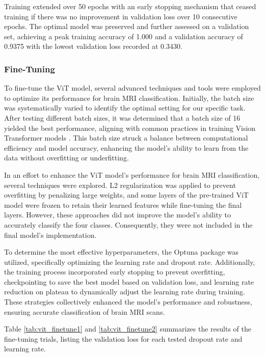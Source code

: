 Training extended over 50 epochs with an early stopping mechanism that ceased training if there was no improvement in validation loss over 10 consecutive epochs. The optimal model was preserved and further assessed on a validation set, achieving a peak training accuracy of 1.000 and a validation accuracy of 0.9375 with the lowest validation loss recorded at 0.3430.


\subsubsection{Fine-Tuning}

To fine-tune the ViT model, several advanced techniques and tools were employed to optimize its performance for brain MRI classification. Initially, the batch size was systematically varied to identify the optimal setting for our specific task. After testing different batch sizes, it was determined that a batch size of 16 yielded the best performance, aligning with common practices in training Vision Transformer models \cite{Al-Hadhrami2023An}. This batch size struck a balance between computational efficiency and model accuracy, enhancing the model's ability to learn from the data without overfitting or underfitting.


In an effort to enhance the ViT model's performance for brain MRI classification, several techniques were explored. L2 regularization was applied to prevent overfitting by penalizing large weights, and some layers of the pre-trained ViT model were frozen to retain their learned features while fine-tuning the final layers. However, these approaches did not improve the model's ability to accurately classify the four classes. Consequently, they were not included in the final model's implementation.

To determine the most effective hyperparameters, the Optuna package was utilized, specifically optimizing the learning rate and dropout rate. Additionally, the training process incorporated early stopping to prevent overfitting, checkpointing to save the best model based on validation loss, and learning rate reduction on plateau to dynamically adjust the learning rate during training. These strategies collectively enhanced the model's performance and robustness, ensuring accurate classification of brain MRI scans.

Table \ref{tab:vit_finetune1} and \ref{tab:vit_finetune2} summarizes the results of the fine-tuning trials, listing the validation loss for each tested dropout rate and learning rate.

